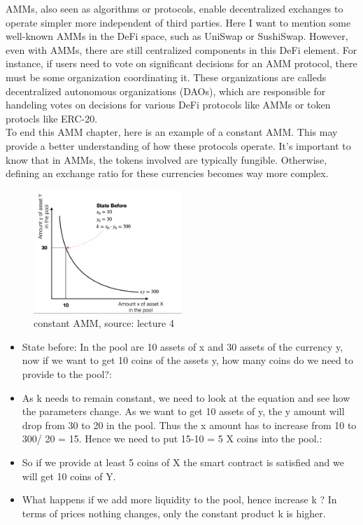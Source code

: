 \documentclass{article}
\begin{document}
AMMs, also seen as algorithms or protocols, enable decentralized exchanges to operate simpler more independent of third parties. Here I want to mention some well-known AMMs in the DeFi space, such as UniSwap or SushiSwap. However, even with AMMs, there are still centralized components in this DeFi element. For instance, if users need to vote on significant decisions for an AMM protocol, there must be some organization coordinating it. These organizations are calleds decentralized autonomous organizations (DAOs), which are responsible for handeling votes on decisions for various DeFi protocols like AMMs or token protocls like ERC-20.
\\
To end this AMM chapter, here is an example of a constant AMM. This may provide a better understanding of how these protocols operate. It's important to know that in AMMs, the tokens involved are typically fungible. Otherwise, defining an exchange ratio for these currencies becomes way more complex.
\begin{figure}[h]
    \centering
    \includegraphics[width=0.5\textwidth]{Bildschirmfoto 2024-04-02 um 15.16.43.png} %
    \caption{constant AMM, \scriptsize{source: lecture 4}}
    \label{fig:DoS-attack}
\end{figure}
\begin{itemize}
    \item {State before: In the pool are 10 assets of x and 30 assets of the currency y, now if we want to get 10 coins of the assets y, how many coins do we need to provide to the pool?}: 
    \item {As k needs to remain constant, we need to look at the equation and see how the parameters change. As we want to get 10 assets of y, the y amount will drop from 30 to 20 in the pool. Thus the x amount has to increase from 10 to 300/ 20 = 15. Hence we need to put 15-10 = 5 X coins into the pool.}:  
    \item {So if we provide at least 5 coins of X the smart contract is satisfied and we will get 10 coins of Y.}
\item {What happens if we add more liquidity to the pool, hence increase k ? In terms of prices nothing changes, only the constant product k is higher.}



\end{itemize}
\end{document}

